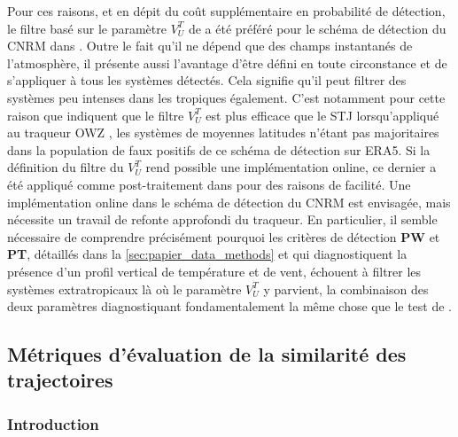 \documentclass[../main.tex]{subfiles}
\begin{document}
Pour ces raisons, et en dépit du coût supplémentaire en probabilité de détection, le filtre basé sur le paramètre $V_U^T$ de \cite{hart_cyclone_2003} a été
préféré pour le schéma de détection du CNRM dans \cite{dulac_assessing_2023}. Outre le fait qu'il ne dépend que des champs instantanés de l'atmosphère, il
présente aussi l'avantage d'être défini en toute circonstance et de s'appliquer à tous les systèmes détectés. Cela signifie qu'il peut filtrer des systèmes peu
intenses dans les tropiques également. C'est notamment pour cette raison que \cite{bourdin_intercomparison_2022} indiquent que le filtre $V_U^T$ est plus
efficace que le STJ lorsqu'appliqué au traqueur OWZ \parencite{tory_importance_2013}, les systèmes de moyennes latitudes n'étant pas majoritaires dans la
population de faux positifs de ce schéma de détection sur ERA5. Si la définition du filtre du $V_U^T$ rend possible une implémentation online, ce dernier a été
appliqué comme post-traitement dans \cite{dulac_assessing_2023} pour des raisons de facilité. Une implémentation online dans le schéma de détection du CNRM est
envisagée, mais nécessite un travail de refonte approfondi du traqueur. En particulier, il semble nécessaire de comprendre précisément pourquoi les critères de
détection \textbf{PW} et \textbf{PT}, détaillés dans la \cref{sec:papier_data_methods} et qui diagnostiquent la présence d'un profil vertical de température et
de vent, échouent à filtrer les systèmes extratropicaux là où le paramètre $V_U^T$ y parvient, la combinaison des deux paramètres diagnostiquant
fondamentalement la même chose que le test de \citeauthor{hart_cyclone_2003}.

\subsection{Métriques d'évaluation de la similarité des trajectoires}\label{sec:similarité}

\subsubsection*{Introduction}
\end{document}
